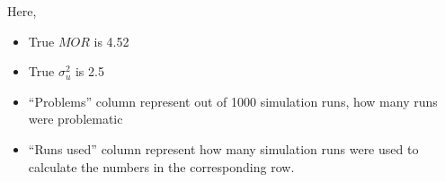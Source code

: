 \documentclass[
  letterpaper,
  DIV=11,
  numbers=noendperiod]{scrartcl}
\providecommand{\tightlist}{%
  \setlength{\itemsep}{0pt}\setlength{\parskip}{0pt}}\usepackage{longtable,booktabs,array}
\begin{document}
\endgroup

\vspace{10mm}

Here,

\begin{itemize}
\tightlist
\item
  True \(MOR\) is 4.52
\item
  True \(\sigma^2_u\) is 2.5
\item
  ``Problems'' column represent out of 1000 simulation runs, how many
  runs were problematic
\item
  ``Runs used'' column represent how many simulation runs were used to
  calculate the numbers in the corresponding row.
\end{itemize}

\newpage
\end{document}
